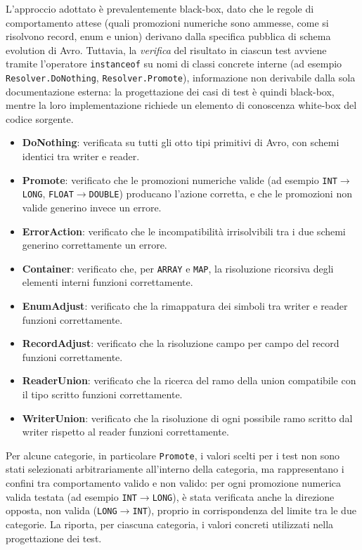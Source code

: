 L'approccio adottato è prevalentemente black-box, dato che le regole di
comportamento attese (quali promozioni numeriche sono ammesse, come si
risolvono record, enum e union) derivano dalla specifica pubblica di
schema evolution di Avro. Tuttavia, la \emph{verifica} del risultato in
ciascun test avviene tramite l'operatore \texttt{instanceof} su nomi di
classi concrete interne (ad esempio \texttt{Resolver.DoNothing},
\texttt{Resolver.Promote}), informazione non derivabile dalla sola
documentazione esterna: la progettazione dei casi di test è quindi
black-box, mentre la loro implementazione richiede un elemento di
conoscenza white-box del codice sorgente.

\begin{itemize}
    \item \textbf{DoNothing}: verificata su tutti gli otto tipi
    primitivi di Avro, con schemi identici tra writer e reader.
    \item \textbf{Promote}: verificato che le promozioni numeriche
    valide (ad esempio \texttt{INT}$\to$\texttt{LONG},
    \texttt{FLOAT}$\to$\texttt{DOUBLE}) producano l'azione corretta, e
    che le promozioni non valide generino invece un errore.
    \item \textbf{ErrorAction}: verificato che le incompatibilità
    irrisolvibili tra i due schemi generino correttamente un errore.
    \item \textbf{Container}: verificato che, per \texttt{ARRAY} e
    \texttt{MAP}, la risoluzione ricorsiva degli elementi interni
    funzioni correttamente.
    \item \textbf{EnumAdjust}: verificato che la rimappatura dei
    simboli tra writer e reader funzioni correttamente.
    \item \textbf{RecordAdjust}: verificato che la risoluzione campo
    per campo del record funzioni correttamente.
    \item \textbf{ReaderUnion}: verificato che la ricerca del ramo
    della union compatibile con il tipo scritto funzioni correttamente.
    \item \textbf{WriterUnion}: verificato che la risoluzione di ogni
    possibile ramo scritto dal writer rispetto al reader funzioni
    correttamente.
\end{itemize}

Per alcune categorie, in particolare \texttt{Promote}, i valori
scelti per i test non sono stati selezionati arbitrariamente
all'interno della categoria, ma rappresentano i confini tra
comportamento valido e non valido: per ogni promozione numerica
valida testata (ad esempio \texttt{INT}$\to$\texttt{LONG}), è stata
verificata anche la direzione opposta, non valida
(\texttt{LONG}$\to$\texttt{INT}), proprio in corrispondenza del limite
tra le due categorie. La  riporta,
per ciascuna categoria, i valori concreti utilizzati nella
progettazione dei test.

